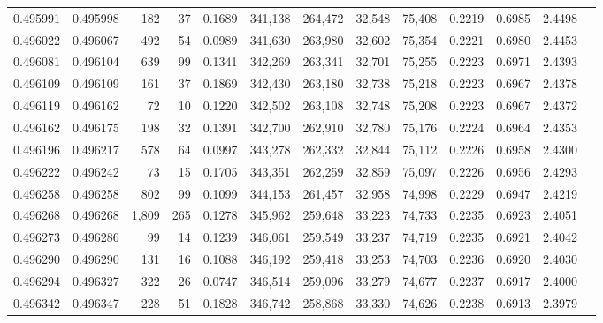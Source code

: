\begin{tabular}{rrrrrrrrrrrrr}
0.495991 & 0.495998 &   182 &    37 &                                     0.1689 & 341,138 & 264,472 &  32,548 &  75,408 & 0.2219 & 0.6985 & 2.4498 \\
0.496022 & 0.496067 &   492 &    54 &                                     0.0989 & 341,630 & 263,980 &  32,602 &  75,354 & 0.2221 & 0.6980 & 2.4453 \\
0.496081 & 0.496104 &   639 &    99 &                                     0.1341 & 342,269 & 263,341 &  32,701 &  75,255 & 0.2223 & 0.6971 & 2.4393 \\
0.496109 & 0.496109 &   161 &    37 &                                     0.1869 & 342,430 & 263,180 &  32,738 &  75,218 & 0.2223 & 0.6967 & 2.4378 \\
0.496119 & 0.496162 &    72 &    10 &                                     0.1220 & 342,502 & 263,108 &  32,748 &  75,208 & 0.2223 & 0.6967 & 2.4372 \\
0.496162 & 0.496175 &   198 &    32 &                                     0.1391 & 342,700 & 262,910 &  32,780 &  75,176 & 0.2224 & 0.6964 & 2.4353 \\
0.496196 & 0.496217 &   578 &    64 &                                     0.0997 & 343,278 & 262,332 &  32,844 &  75,112 & 0.2226 & 0.6958 & 2.4300 \\
0.496222 & 0.496242 &    73 &    15 &                                     0.1705 & 343,351 & 262,259 &  32,859 &  75,097 & 0.2226 & 0.6956 & 2.4293 \\
0.496258 & 0.496258 &   802 &    99 &                                     0.1099 & 344,153 & 261,457 &  32,958 &  74,998 & 0.2229 & 0.6947 & 2.4219 \\
0.496268 & 0.496268 & 1,809 &   265 &                                     0.1278 & 345,962 & 259,648 &  33,223 &  74,733 & 0.2235 & 0.6923 & 2.4051 \\
0.496273 & 0.496286 &    99 &    14 &                                     0.1239 & 346,061 & 259,549 &  33,237 &  74,719 & 0.2235 & 0.6921 & 2.4042 \\
0.496290 & 0.496290 &   131 &    16 &                                     0.1088 & 346,192 & 259,418 &  33,253 &  74,703 & 0.2236 & 0.6920 & 2.4030 \\
0.496294 & 0.496327 &   322 &    26 &                                     0.0747 & 346,514 & 259,096 &  33,279 &  74,677 & 0.2237 & 0.6917 & 2.4000 \\
0.496342 & 0.496347 &   228 &    51 &                                     0.1828 & 346,742 & 258,868 &  33,330 &  74,626 & 0.2238 & 0.6913 & 2.3979 \\

\end{tabular}
